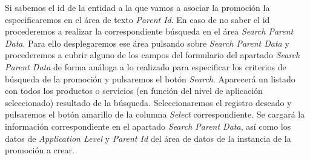 \begin{description}
Si sabemos el id de la entidad a la que vamos a asociar la promoción la especificaremos en el área de texto \emph{Parent Id}. En caso de no saber el id procederemos a realizar la correspondiente búsqueda en el área  \emph{Search Parent Data}. Para ello desplegaremos ese área pulsando sobre \emph{Search Parent Data} y procederemos a cubrir alguno de los campos del formulario del apartado \emph{Search Parent Data} de forma análoga a lo realizado para especificar los criterios de búsqueda de la promoción y pulsaremos el botón \emph{Search}. Aparecerá un listado con todos los productos o servicios (en función del nivel de aplicación seleccionado) resultado de la búsqueda. Seleccionaremos el registro deseado y pulsaremos el botón amarillo de la columna \emph{Select} correspondiente. Se cargará la información correspondiente en el apartado \emph{Search Parent Data}, así como los datos de \emph{Application Level} y \emph{Parent Id} del área de datos de la instancia de la promoción a crear.


\end{description}
